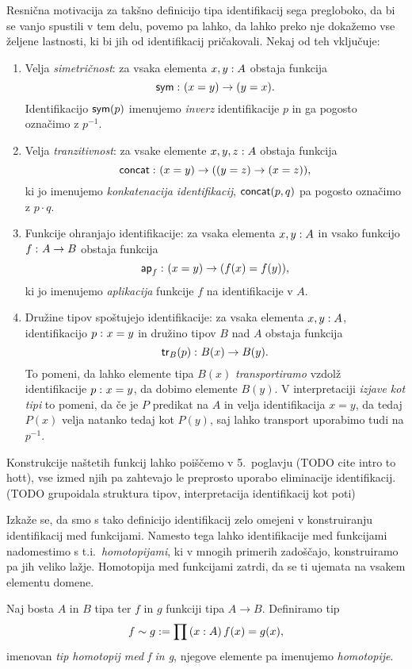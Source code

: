   Resnična motivacija za takšno definicijo tipa identifikacij sega pregloboko, da bi se
  vanjo spustili v tem delu, povemo pa lahko, da lahko preko nje dokažemo vse željene
  lastnosti, ki bi jih od identifikacij pričakovali. Nekaj od teh vključuje:
\begin{enumerate}
\item Velja \emph{simetričnost}: za vsaka elementa \(x, y : A\) obstaja
  funkcija \[\textnormal{\textsf{sym}} \,\colon (x = y) \to (y = x).\] Identifikacijo \(\textnormal{\textsf{sym}}(p)\)
  imenujemo \emph{inverz} identifikacije \(p\) in ga pogosto označimo z \(p^{-1}\).
\item Velja \emph{tranzitivnost}: za vsake elemente \(x, y, z : A\) obstaja
  funkcija \[\textnormal{\textsf{concat}} \,\colon (x = y) \to ((y = z) \to (x = z)),\] ki jo imenujemo
  \emph{konkatenacija identifikacij}, \(\textnormal{\textsf{concat}}(p, q)\) pa pogosto označimo
  z \(p \cdot q\).
\item Funkcije ohranjajo identifikacije: za vsaka elementa \(x, y : A\)
  in vsako funkcijo \(f \,\colon A \to B\) obstaja funkcija
  \[\textnormal{\textsf{ap}}_{f} \,\colon (x = y) \to (f(x) = f(y)),\]
  ki jo imenujemo \emph{aplikacija} funkcije \(f\) na identifikacije v \(A\).
\item Družine tipov spoštujejo identifikacije: za vsaka elementa
  \(x, y : A\), identifikacijo \(p \,\colon x = y\) in družino tipov
  \(B\) nad \(A\) obstaja funkcija
  \[\textnormal{\textsf{tr}}_{B}(p) \,\colon B(x) \to B(y).\] To pomeni, da lahko elemente tipa
  \(B(x)\) \emph{transportiramo} vzdolž identifikacije \(p \,\colon x = y\), da dobimo
  elemente \(B(y)\).
  V interpretaciji \emph{izjave kot tipi} to pomeni, da če je \(P\) predikat na \(A\)
  in velja identifikacija \(x = y\), da tedaj \(P(x)\) velja natanko tedaj kot \(P(y)\),
  saj lahko transport uporabimo tudi na \(p^{-1}\).
\end{enumerate}
Konstrukcije naštetih funkcij lahko poiščemo v 5.~poglavju (TODO cite intro to hott), vse
izmed njih pa zahtevajo le preprosto uporabo eliminacije identifikacij.
(TODO grupoidala struktura tipov, interpretacija identifikacij kot poti)

Izkaže se, da smo s tako definicijo identifikacij zelo omejeni v konstruiranju identifikacij
med funkcijami. Namesto tega lahko identifikacije med funkcijami nadomestimo s
t.i.~\emph{homotopijami}, ki v mnogih primerih zadoščajo, konstruiramo pa jih veliko lažje.
Homotopija med funkcijami zatrdi, da se ti ujemata na vsakem elementu domene.
\begin{definicija}
  Naj bosta \(A\) in \(B\) tipa ter \(f\) in \(g\) funkciji tipa \(A \to B\). Definiramo tip
  \[f \sim g := \prod \left( x : A \right) f(x) = g(x),\]
  imenovan \emph{tip homotopij med f in g}, njegove elemente pa imenujemo \emph{homotopije}.
\end{definicija}


